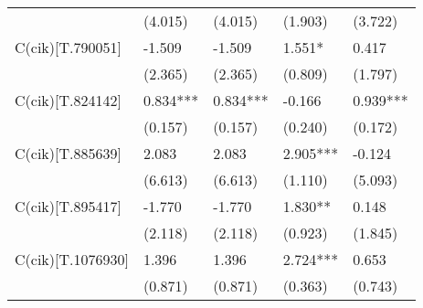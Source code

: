 \begin{table}
\begin{center}
\begin{tabular}{lllll}
                  & (4.015)                                   & (4.015)                                         & (1.903)                                 & (3.722)                                                \\
C(cik)[T.790051]  & -1.509                                    & -1.509                                          & 1.551*                                  & 0.417                                                  \\
                  & (2.365)                                   & (2.365)                                         & (0.809)                                 & (1.797)                                                \\
C(cik)[T.824142]  & 0.834***                                  & 0.834***                                        & -0.166                                  & 0.939***                                               \\
                  & (0.157)                                   & (0.157)                                         & (0.240)                                 & (0.172)                                                \\
C(cik)[T.885639]  & 2.083                                     & 2.083                                           & 2.905***                                & -0.124                                                 \\
                  & (6.613)                                   & (6.613)                                         & (1.110)                                 & (5.093)                                                \\
C(cik)[T.895417]  & -1.770                                    & -1.770                                          & 1.830**                                 & 0.148                                                  \\
                  & (2.118)                                   & (2.118)                                         & (0.923)                                 & (1.845)                                                \\
C(cik)[T.1076930] & 1.396                                     & 1.396                                           & 2.724***                                & 0.653                                                  \\
                  & (0.871)                                   & (0.871)                                         & (0.363)                                 & (0.743)                                                \\

\end{tabular}
\end{center}
\end{table}
